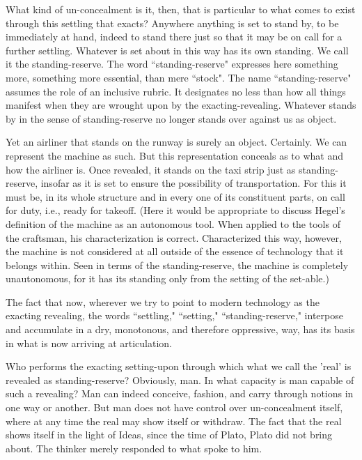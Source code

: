 \documentclass[12pt]{article}
\begin{document}
What kind of un-concealment is it, then, that is particular to what comes to exist through this settling that exacts? Anywhere anything is set to stand by, to be immediately at hand, indeed to stand there just so that it may be on call for a further settling. Whatever is set about in this way has its own standing. We call it the standing-reserve. The word ``standing-reserve" expresses here something more, something more essential, than mere ``stock". The name ``standing-reserve" assumes the role of an inclusive rubric. It designates no less than how all things manifest when they are wrought upon by the exacting-revealing. Whatever stands by in the sense of standing-reserve no longer stands over against us as object.

Yet an airliner that stands on the runway is surely an object. Certainly. We can represent the machine as such. But this representation conceals as to what and how the airliner is. Once revealed, it stands on the taxi strip just as standing-reserve, insofar as it is set to ensure the possibility of transportation. For this it must be, in its whole structure and in every one of its constituent parts, on call for duty, i.e., ready for takeoff. (Here it would be appropriate to discuss Hegel's definition of the machine as an autonomous tool. When applied to the tools of the craftsman, his characterization is correct. Characterized this way, however, the machine is not considered at all outside of the essence of technology that it belongs within. Seen in terms of the standing-reserve, the machine is completely unautonomous, for it has its standing only from the setting of the set-able.)

The fact that now, wherever we try to point to modern technology as the exacting revealing, the words ``settling," ``setting," ``standing-reserve," interpose and accumulate in a dry, monotonous, and therefore oppressive, way, has its basis in what is now arriving at articulation.

Who performs the exacting setting-upon through which what we call the 'real' is revealed as standing-reserve? Obviously, man. In what capacity is man capable of such a revealing? Man can indeed conceive, fashion, and carry through notions in one way or another. But man does not have control over un-concealment itself, where at any time the real may show itself or withdraw. The fact that the real shows itself in the light of Ideas, since the time of Plato, Plato did not bring about. The thinker merely responded to what spoke to him.
\end{document}
